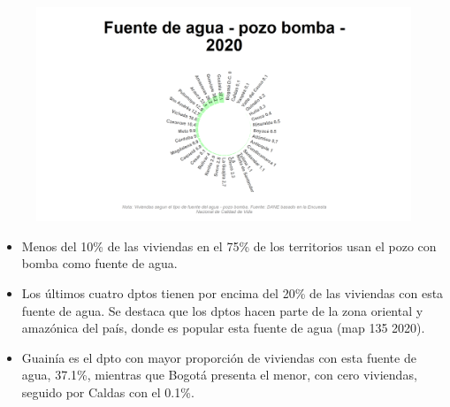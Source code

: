     \begin{figure}[H]
        \caption[Pozo con bomba como fuentes de agua por departamentos para 2020 ]{\label{pozo_bomba_dptos} }
        \begin{center}
        \includegraphics[width=\textwidth,keepaspectratio]{img/var_135_static.png}
        \end{center}
    \end{figure}
            \begin{itemize}
                    \item Menos del 10\% de las viviendas en el 75\% de los territorios usan el pozo con bomba como fuente de agua.
                    \item Los últimos cuatro dptos tienen por encima del 20\% de las viviendas con esta fuente de agua. Se destaca que los dptos hacen parte de la zona oriental y amazónica del país, donde es popular esta fuente de agua (map 135 2020).
                    \item Guainía es el dpto con mayor proporción de viviendas con esta fuente de agua, 37.1\%, mientras que Bogotá presenta el menor, con cero viviendas, seguido por Caldas con el 0.1\%.
                    \end{itemize}

